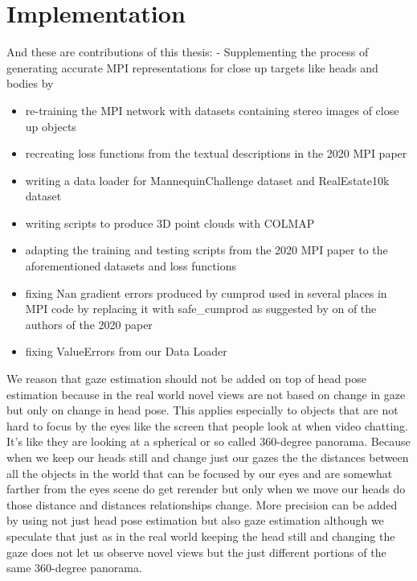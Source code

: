 \section{Implementation}\label{sec:implementation} 


And these are contributions of this thesis: -
Supplementing the process of generating accurate MPI representations for close up targets like heads and bodies by 
\begin{itemize}
    \item re-training the MPI network with datasets containing stereo images of close up objects  
    \item recreating loss functions from the textual descriptions in the 2020 MPI paper
    \item writing a data loader for MannequinChallenge dataset and RealEstate10k dataset
    \item writing scripts to produce 3D point clouds with COLMAP
    \item adapting the training and testing scripts from the 2020 MPI paper to the aforementioned datasets and loss functions
    \item fixing Nan gradient errors produced by cumprod used in several places in MPI code by replacing it with safe\_cumprod as suggested by on of the authors of the 2020 paper
    \item fixing ValueErrors from our Data Loader
\end{itemize}

We reason that gaze estimation should not be added on top of head pose estimation because in the real world novel views are not based on change in gaze but only on change in head pose. This applies especially to  objects that are not hard to focus by the eyes like the screen that people look at when video chatting. It's like they are looking at a spherical or so called 360-degree panorama. Because when we keep our heads still and change just our gazes the the distances between all the objects in the world that can be focused by our eyes and are somewhat farther from the eyes scene do get rerender but only when we move our heads do those distance and distances relationships change. More precision can be added by using not just head pose estimation but also gaze estimation although we speculate that just as in the real world keeping the head still and changing the gaze does not let us observe novel views but the just different portions of the same 360-degree panorama.

